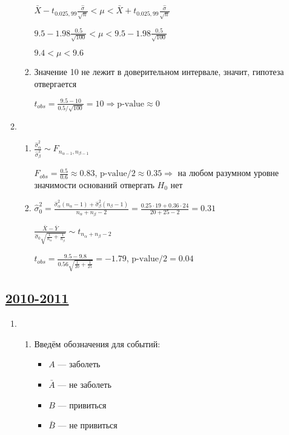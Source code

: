 \begin{enumerate}[resume]
\begin{enumerate}
\begin{enumerate}
$\bar{X} - t_{0.025, 99}\frac{\hat{\sigma}}{\sqrt{n}} < \mu < \bar{X} + t_{0.025, 99}\frac{\hat{\sigma}}{\sqrt{n}}$

$9.5 - 1.98 \frac{0.5}{\sqrt{100}} < \mu < 9.5 - 1.98 \frac{0.5}{\sqrt{100}} $

$9.4 < \mu < 9.6$
\item  Значение 10 не лежит в доверительном интервале, значит, гипотеза отвергается

$t_{obs} = \frac{9.5-10}{0.5/\sqrt{100}} = 10 \Rightarrow \text{p-value} \approx 0$
\end{enumerate}
\item
\begin{enumerate}
\item $\frac{\hat{\sigma}_\alpha^2}{\hat{\sigma}_\beta^2} \sim F_{n_{\alpha-1}, n_{\beta-1}}$

$F_{obs} = \frac{0.5}{0.6} \approx 0.83$, $\text{p-value}/ 2\approx 0.35 \Rightarrow$ на любом разумном уровне значимости оснований отвергать $H_0$ нет
\item $\hat{\sigma}_0^2 = \frac{\hat{\sigma}_\alpha^2(n_\alpha -1) + \hat{\sigma}_\beta^2(n_\beta-1)}{n_\alpha+n_\beta-2} = \frac{0.25\cdot19 + 0.36\cdot24}{20+25-2}=0.31$

$\frac{\bar{X} - \overline{Y}}{\hat{\sigma}_0 \sqrt{\frac{1}{n_\alpha}+\frac{1}{n_\beta}}} \sim t_{n_\alpha+n_\beta-2}$

$t_{obs} = \frac{9.5-9.8}{0.56\sqrt{\frac{1}{20}+ \frac{1}{25}}} = -1.79$, $\text{p-value}/2=0.04$

\end{enumerate}
\end{enumerate}


\subsection[2010-2011]{\hyperref[sec:kr_03_2010_2011]{2010-2011}}
\label{sec:sol_kr_03_2010_2011}


\begin{enumerate}
\item
\begin{enumerate}
\item Введём обозначения для событий:
\begin{itemize}
  \item $A$ — заболеть
  \item $\bar A$ — не заболеть
  \item $B$ — привиться
  \item $\bar B$ — не привиться
\end{itemize}


\end{enumerate}
\end{enumerate}
\end{enumerate}
